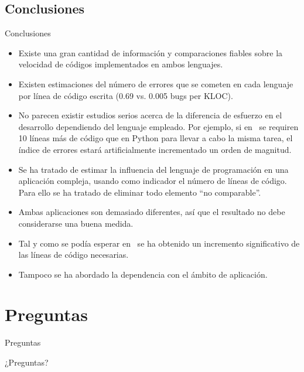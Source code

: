 \subsection{Conclusiones}
\begin{frame}{Conclusiones}
\begin{itemize}
	\item Existe una gran cantidad de información y comparaciones fiables sobre la
	velocidad de códigos implementados en ambos lenguajes. \pause
	\item Existen estimaciones del número de errores que se cometen en cada
	lenguaje por línea de código escrita (0.69 vs. 0.005 bugs per KLOC). \pause
	\item No parecen existir estudios serios acerca de la diferencia de esfuerzo
	en el desarrollo dependiendo del lenguaje empleado.
	Por ejemplo, si en \CC $\,$ se requiren 10 líneas más de código que en Python
	para llevar a cabo la misma tarea, el índice de errores estará artificialmente
	incrementado un orden de magnitud. \pause
	\item Se ha tratado de estimar la influencia del lenguaje de programación
	en una aplicación compleja, usando como indicador el número de líneas
	de código. Para ello se ha tratado de eliminar todo elemento ``no comparable''.
	\pause
	\item Ambas aplicaciones son demasiado diferentes, así que el resultado no
	debe considerarse una buena medida. \pause
	\item Tal y como se podía esperar en \CC $\,$ se ha obtenido un incremento
	significativo de las líneas de código necesarias. \pause
	\item Tampoco se ha abordado la dependencia con el ámbito de aplicación.
\end{itemize}
\end{frame}

\section{Preguntas}
\begin{frame}{Preguntas}
\begin{center}
{\Huge ¿Preguntas?}
\end{center}
\end{frame}
